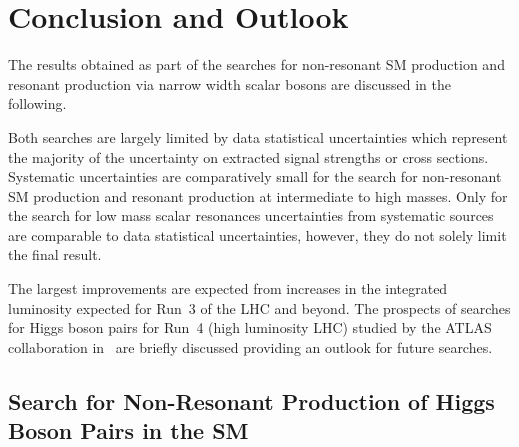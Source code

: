 \section{Conclusion and Outlook}%
\label{sec:result_discussion}




The results obtained as part of the searches for non-resonant SM \HH
production and resonant production via narrow width scalar bosons are
discussed in the following.

Both searches are largely limited by data statistical uncertainties
which represent the majority of the uncertainty on extracted signal
strengths or cross sections. Systematic uncertainties are
comparatively small for the search for non-resonant SM \HH production
and resonant production at intermediate to high masses. Only for the
search for low mass scalar resonances uncertainties from systematic
sources are comparable to data statistical uncertainties, however,
they do not solely limit the final result.

The largest improvements are expected from increases in the integrated
luminosity expected for Run~3 of the LHC and beyond. The prospects of
searches for Higgs boson pairs for Run~4 (high luminosity LHC) studied
by the ATLAS collaboration
in~\cite{ATL-PHYS-PUB-2021-044,ATL-PHYS-PUB-2022-005} are briefly
discussed providing an outlook for future searches.


\subsection{Search for Non-Resonant Production of Higgs Boson Pairs in
  the SM}

